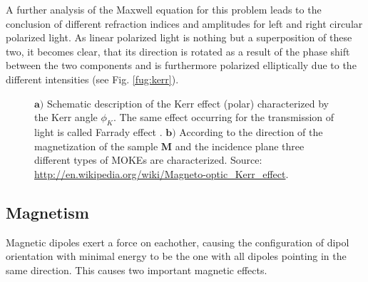\documentclass[a4paper]{scrartcl}
\numberwithin{equation}{section}
\numberwithin{figure}{section}
\numberwithin{table}{section}
\newcommand{\ve}[1]{\mathbf{ #1} }
\begin{document}
A further analysis of the Maxwell equation for this problem \cite{book} leads to the conclusion of different refraction indices and amplitudes for left and right circular polarized light. As linear polarized light is nothing but a superposition of these two, it becomes clear, that its direction is rotated as a result of the phase shift between the two components and is furthermore polarized elliptically due to the different intensities (see Fig. \ref{fug:kerr}).



\begin{figure} 
 \centering
{}
{}

\caption{
\small $\ve a)$ Schematic description of the Kerr effect (polar) characterized by the Kerr angle $\phi_K$. The same effect occurring for the transmission of light is called Farrady effect \cite{dissert}. $\ve b)$ According to the direction of the magnetization of the sample $\ve M$ and the incidence plane three different types of MOKEs are characterized. 
Source: \url{http://en.wikipedia.org/wiki/Magneto-optic_Kerr_effect}. } 
	\label{fig:kerr}
\end{figure}




\subsection{Magnetism}
Magnetic dipoles exert a force on eachother, causing the configuration of dipol orientation with minimal energy to be the one with all dipoles pointing in the same direction. This causes two important magnetic effects.
\end{document}
